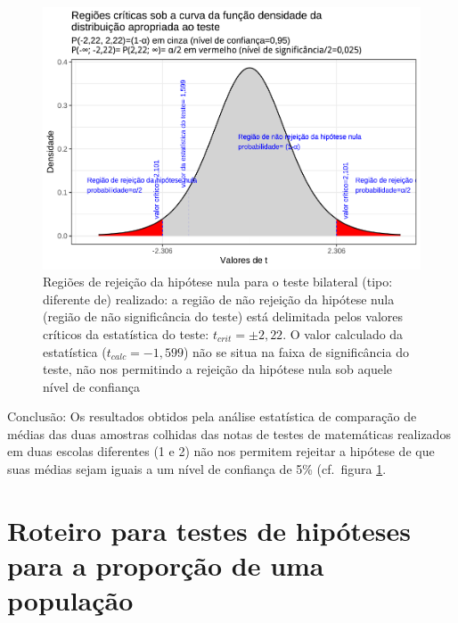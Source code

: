 \documentclass[
]{book}
\begin{document}
\begin{figure}

{\centering \includegraphics[width=1\linewidth]{apostila_files/figure-latex/fig91-1} 

}

\caption{Regiões de rejeição da hipótese nula para o teste bilateral (tipo: diferente de) realizado: a região de não rejeição da hipótese nula (região de não significância do teste) está delimitada pelos valores críticos da estatística do teste: $t_{crit} =\pm 2,22$. O valor calculado da estatística ($t_{calc}=-1,599$) não se situa na faixa de significância do teste, não nos permitindo a rejeição da hipótese nula sob aquele nível de confiança}\label{fig:fig91}
\end{figure}

\hfill\break

Conclusão: Os resultados obtidos pela análise estatística de comparação de médias das duas amostras colhidas das notas de testes de matemáticas realizados em duas escolas diferentes (1 e 2) não nos permitem rejeitar a hipótese de que suas médias sejam iguais a um nível de confiança de 5\% (cf.~figura \ref{fig:fig91}.

\hfill\break

\hypertarget{roteiro-para-testes-de-hipuxf3teses-para-a-proporuxe7uxe3o-de-uma-populauxe7uxe3o}{%
\section{Roteiro para testes de hipóteses para a proporção de uma população}\label{roteiro-para-testes-de-hipuxf3teses-para-a-proporuxe7uxe3o-de-uma-populauxe7uxe3o}}
\end{document}
